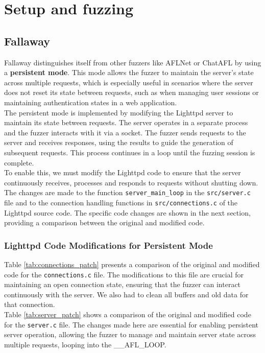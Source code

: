 \chapter{Setup and fuzzing}

\section{Fallaway}
Fallaway distinguishes itself from other fuzzers like AFLNet or ChatAFL by using a \textbf{persistent mode}. This mode allows the fuzzer to maintain the server's state across multiple requests, which is especially useful in scenarios where the server does not reset its state between requests, such as when managing user sessions or maintaining authentication states in a web application.
\\The persistent mode is implemented by modifying the Lighttpd server to maintain its state between requests. The server operates in a separate process and the fuzzer interacts with it via a socket. The fuzzer sends requests to the server and receives responses, using the results to guide the generation of subsequent requests. This process continues in a loop until the fuzzing session is complete.
\\To enable this, we must modify the Lighttpd code to ensure that the server continuously receives, processes and responds to requests without shutting down. The changes are made to the function \texttt{server\_main\_loop} in the \texttt{src/server.c} file and to the connection handling functions in \texttt{src/connections.c} of the Lighttpd source code. The specific code changes are shown in the next section, providing a comparison between the original and modified code.

\subsection{Lighttpd Code Modifications for Persistent Mode}

Table \ref{tab:connections_patch} presents a comparison of the original and modified code for the \texttt{connections.c} file. The modifications to this file are crucial for maintaining an open connection state, ensuring that the fuzzer can interact continuously with the server. We also had to clean all buffers and old data for that connection.
\\Table \ref{tab:server_patch} shows a comparison of the original and modified code for the \texttt{server.c} file. The changes made here are essential for enabling persistent server operation, allowing the fuzzer to manage and maintain server state across multiple requests, looping into the \_\_AFL\_LOOP.

